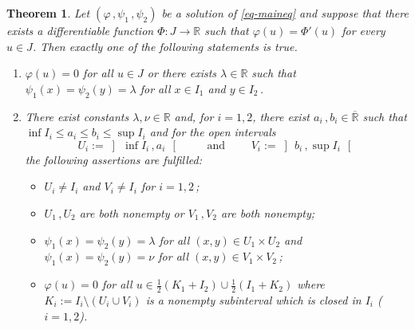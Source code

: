 \documentclass[12pt]{amsart}
\newtheorem{thm}{Theorem}
\theoremstyle{remark}
\theoremstyle{definition}
\newcommand{\RR}{\mathbb{R}}
\newcommand{\RRx}{\overline{\mathbb{R}}}
\newcommand{\map}{\longrightarrow}
\begin{document}
\begin{thm}\label{thm-main_derivative}
Let 
$ \left( \varphi \,, \psi_1 \,, \psi_2 \right) $ 
be a solution of \eqref{eq-maineq} 
and suppose that 
there exists a differentiable function 
$ \Phi : J \map \RR $ such that 
$ \varphi (u) = \Phi'(u) $ 
for every $ u \in J $. 
Then exactly one of the following statements is true. 
\begin{enumerate}
\item 
$ \varphi (u) = 0 $ for all $ u \in J $ or 
there exists $ \lambda \in \RR $ such that 
$ \psi_1(x) = \psi_2(y) = \lambda $ 
for all $ x \in I_1 $ and $ y \in I_2 \,$. 
\item 
There exist constants 
$ \lambda, \nu \in \RR $ and, for 
$ i = 1,2 $, there exist 
$ a_i \,, b_i \in \RRx $ such that 
$ \inf I_i \leq a_i \leq b_i \leq \sup I_i $ and 
for the open intervals 
\[
U_i := \left] \, \inf I_i \,, a_i \, \right[ 
\qquad \mbox{ and } \qquad 
V_i := \left] \, b_i \,, \sup I_i \, \right[ 
\]
the following assertions are fulfilled: 
\begin{itemize}
\item 
$ U_i \neq I_i $ and $ V_i \neq I_i $ 
for $ i = 1,2 \,$; 
\item 
$ U_1 \,, U_2 $ are both nonempty or 
$ V_1 \,, V_2 $ are both nonempty; 
\item 
$ \psi_1 (x) =  \psi_2 (y) = \lambda $ for all 
$ (x,y) \in U_1 \times U_2 $ and 
$ \psi_1 (x) =  \psi_2 (y) = \nu $ for all 
$ (x,y) \in V_1 \times V_2 \,$; 
\item 
$ \varphi (u) = 0 $ for all 
$ u \in 
\frac{1}{2} \left( K_1 + I_2 \right) \cup 
\frac{1}{2} \left( I_1 + K_2 \right) $ 
where 
$ K_i := I_i \setminus \left( U_i \cup V_i \right) $ 
is a nonempty subinterval 
which is closed in $ I_i $ ($ i=1,2 $). 
\end{itemize}


\end{enumerate}
\end{thm}
\end{document}
